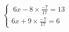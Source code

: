 \documentclass[preview]{standalone}
\begin{document}
\begin{align*}
\left\{ \begin{array}{cl} \ 6x - 8\times\frac{-7}{17} = 13 \\6x + 9\times\frac{-7}{17} = 6 \end{array} \right.
\end{align*}
\end{document}
